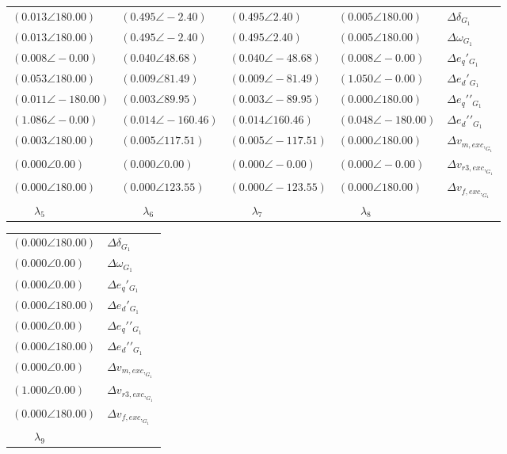\begin{tabular}{llll|l}
$(0.013 \angle 180.00)$	& $\mathbf{(0.495 \angle -2.40)}$	& $\mathbf{(0.495 \angle 2.40)}$	& $(0.005 \angle 180.00)$	& $\Delta\delta_{G_1}$ \\ 
$(0.013 \angle 180.00)$	& $\mathbf{(0.495 \angle -2.40)}$	& $\mathbf{(0.495 \angle 2.40)}$	& $(0.005 \angle 180.00)$	& $\Delta\omega_{G_1}$ \\ 
$(0.008 \angle -0.00)$	& $(0.040 \angle 48.68)$	& $(0.040 \angle -48.68)$	& $(0.008 \angle -0.00)$	& $\Delta e_q\prime_{G_1}$ \\ 
$(0.053 \angle 180.00)$	& $(0.009 \angle 81.49)$	& $(0.009 \angle -81.49)$	& $\mathbf{(1.050 \angle -0.00)}$	& $\Delta e_d\prime_{G_1}$ \\ 
$(0.011 \angle -180.00)$	& $(0.003 \angle 89.95)$	& $(0.003 \angle -89.95)$	& $(0.000 \angle 180.00)$	& $\Delta e_q\prime\prime_{G_1}$ \\ 
$\mathbf{(1.086 \angle -0.00)}$	& $(0.014 \angle -160.46)$	& $(0.014 \angle 160.46)$	& $(0.048 \angle -180.00)$	& $\Delta e_d\prime\prime_{G_1}$ \\ 
$(0.003 \angle 180.00)$	& $(0.005 \angle 117.51)$	& $(0.005 \angle -117.51)$	& $(0.000 \angle 180.00)$	& $\Delta v_{m,exc,_{G_1}}$ \\ 
 \hline 
$(0.000 \angle 0.00)$	& $(0.000 \angle 0.00)$	& $(0.000 \angle -0.00)$	& $(0.000 \angle -0.00)$	& $\Delta v_{r3,exc,_{G_1}}$ \\ 
$(0.000 \angle 180.00)$	& $(0.000 \angle 123.55)$	& $(0.000 \angle -123.55)$	& $(0.000 \angle 180.00)$	& $\Delta v_{f,exc,_{G_1}}$ \\ 
 \hline 
\hline 
$\qquad\lambda_{5}$	&$\qquad\lambda_{6}$	&$\qquad\lambda_{7}$	&$\qquad\lambda_{8}$	&
\end{tabular}

\begin{tabular}{l|l}
$(0.000 \angle 180.00)$	& $\Delta\delta_{G_1}$ \\ 
$(0.000 \angle 0.00)$	& $\Delta\omega_{G_1}$ \\ 
$(0.000 \angle 0.00)$	& $\Delta e_q\prime_{G_1}$ \\ 
$(0.000 \angle 180.00)$	& $\Delta e_d\prime_{G_1}$ \\ 
$(0.000 \angle 0.00)$	& $\Delta e_q\prime\prime_{G_1}$ \\ 
$(0.000 \angle 180.00)$	& $\Delta e_d\prime\prime_{G_1}$ \\ 
$(0.000 \angle 0.00)$	& $\Delta v_{m,exc,_{G_1}}$ \\ 
 \hline 
$\mathbf{(1.000 \angle 0.00)}$	& $\Delta v_{r3,exc,_{G_1}}$ \\ 
$(0.000 \angle 180.00)$	& $\Delta v_{f,exc,_{G_1}}$ \\ 
 \hline 
\hline 
$\qquad\lambda_{9}$	&
\end{tabular}

